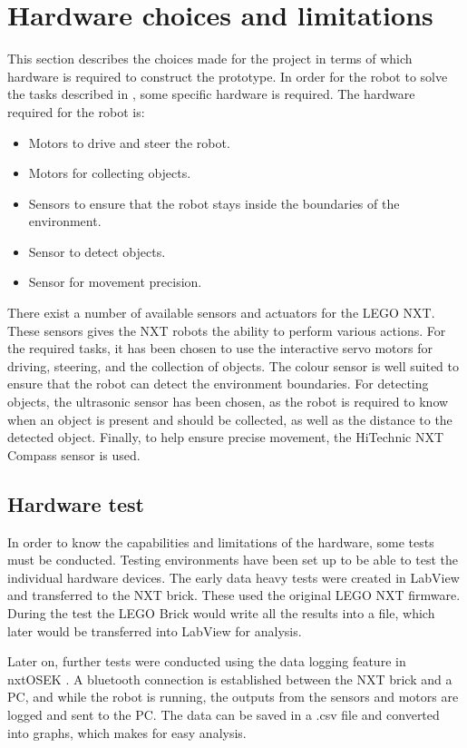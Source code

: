 \section{Hardware choices and limitations}\label{sec:hardware}

This section describes the choices made for the project in terms of which hardware is required to construct the \projname{} prototype. In order for the robot to solve the tasks described in , some specific hardware is required. The hardware required for the robot is:

\begin{itemize}
\item Motors to drive and steer the robot.
\item Motors for collecting objects.
\item Sensors to ensure that the robot stays inside the boundaries of the environment.
\item Sensor to detect objects.
\item Sensor for movement precision.
\end{itemize}

There exist a number of available sensors and actuators for the LEGO NXT. These sensors gives the NXT robots the ability to perform various actions. For the required tasks, it has been chosen to use the interactive servo motors for driving, steering, and the collection of objects. The colour sensor is well suited to ensure that the robot can detect the environment boundaries. For detecting objects, the ultrasonic sensor has been chosen, as the robot is required to know when an object is present and should be collected, as well as the distance to the detected object. Finally, to help ensure precise movement, the HiTechnic NXT Compass sensor is used.

\subsection{Hardware test} \label{sec:hardware_test}
In order to know the capabilities and limitations of the hardware, some tests must be conducted. Testing environments have been set up to be able to test the individual hardware devices. The early data heavy tests were created in LabView and transferred to the NXT brick. These used the original LEGO NXT firmware. During the test the LEGO Brick would write all the results into a file, which later would be transferred into LabView for analysis. 

Later on, further tests were conducted using the data logging feature in nxtOSEK \citep{datalogging}. A bluetooth connection is established between the NXT brick and a PC, and while the robot is running, the outputs from the sensors and motors are logged and sent to the PC. The data can be saved in a .csv file and converted into graphs, which makes for easy analysis.

